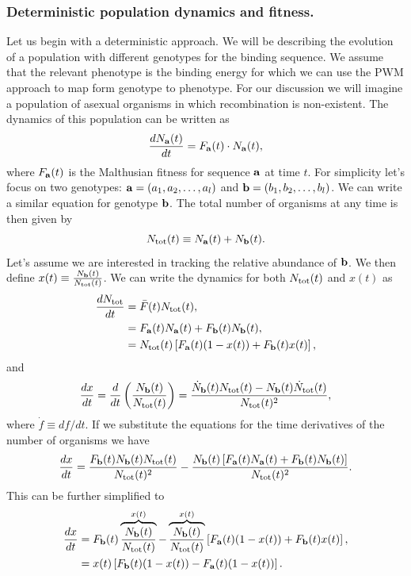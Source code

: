 \subsubsection{Deterministic population dynamics and fitness.}

Let us begin with a deterministic approach. We will be describing the evolution
of a population with different genotypes for the binding sequence. We assume
that the relevant phenotype is the binding energy for which we can use the PWM
approach to map form genotype to phenotype. For our discussion we will imagine
a population of asexual organisms in which recombination is non-existent.
The dynamics of this population can be written as
\begin{equation}
  {d{N_{\mathbf{a}}(t)} \over dt} = F_{\mathbf{a}}(t) \cdot N_{\mathbf{a}}(t),
\end{equation}
where $F_{\mathbf{a}}(t)$ is the Malthusian fitness for sequence $\mathbf{a}$ at time $t$.
For simplicity let's focus on two genotypes: $\mathbf{a} = (a_1, a_2, \ldots, a_l)$
and $\mathbf{b} = (b_1, b_2, \ldots, b_l)$. We can write a similar equation for
genotype $\mathbf{b}$. The total number of organisms at any time is then given by
\begin{equation}
  N_{\text{tot}}(t) \equiv N_{\mathbf{a}}(t) + N_{\mathbf{b}}(t).
\end{equation}
Let's assume we are interested in tracking the relative abundance of $\mathbf{b}$.
We then define $x(t) \equiv {N_{\mathbf{b}}(t) \over N_{\text{tot}}(t)}$. We can write the
dynamics for both $N_{\text{tot}}(t)$ and $x(t)$ as
\begin{align}
{d{N_{\text{tot}}} \over dt} &= \bar{F}(t) N_{\text{tot}}(t),\\
&= F_{\mathbf{a}}(t) N_{\mathbf{a}}(t) + F_{\mathbf{b}}(t) N_{\mathbf{b}}(t),\\
&= N_{\text{tot}}(t) \left[ F_{\mathbf{a}}(t) (1 - x(t)) + F_{\mathbf{b}}(t) x(t) \right],
\end{align}
and
\begin{equation}
  {d{x} \over dt} = {d \over dt} \left( {N_{\mathbf{b}}(t) \over N_{\text{tot}}(t)} \right)
  = {\dot{N}_{\mathbf{b}}(t) N_{\text{tot}}(t) - N_{\mathbf{b}}(t) \dot{N}_{\text{tot}}(t) \over
     N_{\text{tot}}(t)^2},
\end{equation}
where $\dot{f} \equiv df/dt$. If we substitute the equations for the time
derivatives of the number of organisms we have
\begin{equation}
  {d{x} \over dt} = {F_{\mathbf{b}}(t) N_{\mathbf{b}}(t) N_{\text{tot}}(t) \over N_{\text{tot}}(t)^2} -
  {N_{\mathbf{b}}(t) \left[ F_{\mathbf{a}}(t)N_{\mathbf{a}}(t) + F_{\mathbf{b}}(t)N_{\mathbf{b}}(t) \right]
  \over N_{\text{tot}}(t)^2}.
\end{equation}
This can be further simplified to
\begin{align}
  {d{x} \over dt} &= F_{\mathbf{b}}(t) \overbrace{N_{\mathbf{b}}(t) \over N_{\text{tot}}(t)}^{x(t)} -
  \overbrace{N_{\mathbf{b}}(t) \over N_{\text{tot}}(t)}^{x(t)}
  \left[ F_{\mathbf{a}}(t) (1 - x(t)) + F_{\mathbf{b}}(t) x(t) \right],\\
  &= x(t) \left[ F_{\mathbf{b}}(t) (1 - x(t)) - F_{\mathbf{a}}(t) (1 - x(t)) \right].
\end{align}

